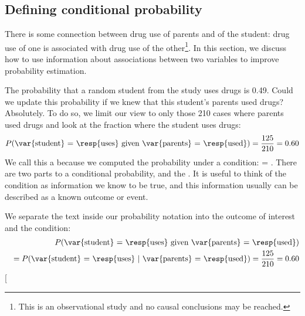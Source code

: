 

\subsection{Defining conditional probability}

There is some connection between drug use of parents and of the student: drug use of one is associated with drug use of the other\footnote{This is an observational study and no causal conclusions may be reached.}. In this section, we discuss how to use information about associations between two variables to improve probability estimation.

The probability that a random student from the study uses drugs is 0.49. Could we update this probability if we knew that this student's parents used drugs? Absolutely. To do so, we limit our view to only those 210 cases where parents used drugs and look at the fraction where the student uses drugs:
\begin{eqnarray*}
P(\text{\var{student} = \resp{uses} given \var{parents} = \resp{used}}) = \frac{125}{210} = 0.60
\end{eqnarray*}
We call this a  because we computed the probability under a condition:  = . There are two parts to a conditional probability,  and the . It is useful to think of the condition as information we know to be true, and this information usually can be described as a known outcome or event.

We separate the text inside our probability notation into the outcome of interest and the condition:
\begin{eqnarray}
&& P(\text{\var{student} = \resp{uses} given \var{parents} = \resp{used}}) \notag \\
&& = P(\text{\var{student} = \resp{uses} } | \text{ \var{parents} = \resp{used}}) = \frac{125}{210} = 0.60
\label{probStudentUsedIfParentsUsedInFormalNotation}
\end{eqnarray}
\marginpar[\raggedright\vspace{-10mm}

